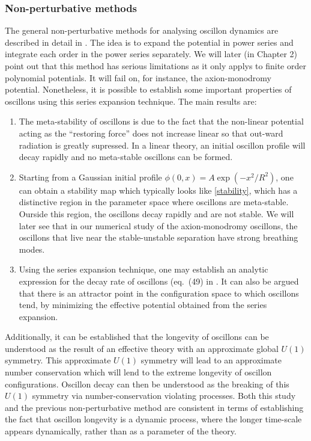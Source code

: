 \documentclass{report}
\begin{document}
\subsubsection{Non-perturbative methods}
The general non-perturbative methods for analysing oscillon dynamics are described in detail in \cite{Copeland:1995fq, PhysRevD.80.125037, Gleiser:2008ty}. The idea is to expand the potential in power series and integrate each order in the power series separately. We will later (in Chapter 2) point out that this method has serious limitations as it only applys to finite order polynomial potentials. It will fail on, for instance, the axion-monodromy potential. Nonetheless, it is possible to establish some important properties of oscillons using this series expansion technique. The main results are:
\begin{enumerate}
\item The meta-stability of oscillons is due to the fact that the non-linear potential acting as the ``restoring force'' does not increase linear so that out-ward radiation is greatly supressed. In a linear theory, an initial oscillon profile will decay rapidly and no meta-stable oscillons can be formed.
\item Starting from a Gaussian initial profile $\phi(0,x)=A\exp(-x^2/R^2)$, one can obtain a stability map which typically looks like \ref{stability}, which has a distinctive region in the parameter space where oscillons are meta-stable. Ourside this region, the oscillons decay rapidly and are not stable. We will later see that in our numerical study of the axion-monodromy oscillons, the oscillons that live near the stable-unstable separation have strong breathing modes.
\item Using the series expansion technique, one may establish an analytic expression for the decay rate of oscillons (eq.~(49) in \cite{PhysRevD.80.125037}. It can also be argued that there is an attractor point in the configuration space to which oscillons tend, by minimizing the effective potential obtained from the series expansion.
\end{enumerate}

Additionally, it can be established \cite{Mukaida:2016hwd} that the longevity of oscillons can be understood as the result of an effective theory with an approximate global $U(1)$ symmetry. This approximate $U(1)$ symmetry will lead to an approximate number conservation which will lend to the extreme longevity of oscillon configurations. Oscillon decay can then be understood as the breaking of this $U(1)$ symmetry via number-conservation violating processes. Both this study and the previous non-perturbative method are consistent in terms of establishing the fact that oscillon longevity is a dynamic process, where the longer time-scale appears dynamically, rather than as a parameter of the theory.
\end{document}

